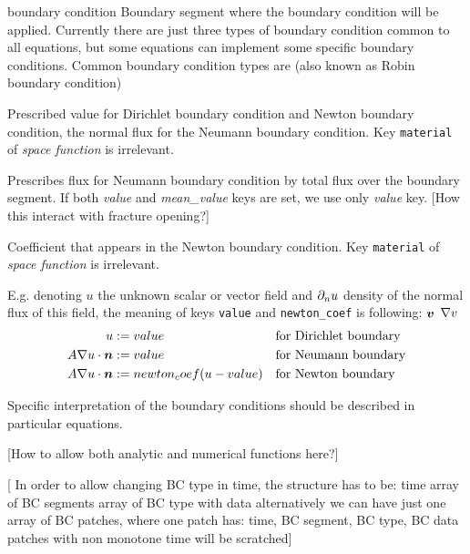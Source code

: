 \begin{recordtype}{boundary condition}{}
  Boundary segment where the boundary condition will be applied.
  Currently there are just three types of boundary condition common to all equations, 
  but some equations can implement some specific boundary conditions. Common boundary condition  types are
   (also known as Robin boundary condition)


Prescribed value for Dirichlet boundary condition and Newton boundary condition, the normal flux for the Neumann boundary condition.
Key \verb'material' of {\it space function} is irrelevant.

Prescribes flux for Neumann boundary condition by total flux over the boundary segment. If both {\it value} and {\it mean\_value} keys
are set, we use only {\it value} key. 
[How this interact with fracture opening?]


Coefficient that appears in the Newton boundary condition. Key \verb'material' of {\it space function} is irrelevant.
\end{recordtype}

E.g. denoting $u$ the unknown scalar or vector field and $\partial_n u$ density of the normal flux of this field,
the meaning of keys \verb'value' and \verb'newton_coef' is following:
$\mathbf{\boldsymbol{v}}$ $\nabla v$
\begin{align*}
 u &:= value &&\text{for Dirichlet boundary} \\
 A\nabla u \cdot \mathbf{\boldsymbol{n}} &:= value && \text{for Neumann  boundary} \\
A\nabla u \cdot \mathbf{\boldsymbol{n}} &:= newton_coef ( u - value ) && \text{for Newton boundary}
\end{align*}

Specific interpretation of the boundary conditions should be described in particular equations.

[How to allow both analytic  and numerical functions here?]

[ In order to allow changing BC type in time, the structure has to be: time array of BC segments array of BC type with data
alternatively we can have just one array of BC patches, where one patch has: time, BC segment, BC type, BC data
patches with non monotone time will be scratched]

